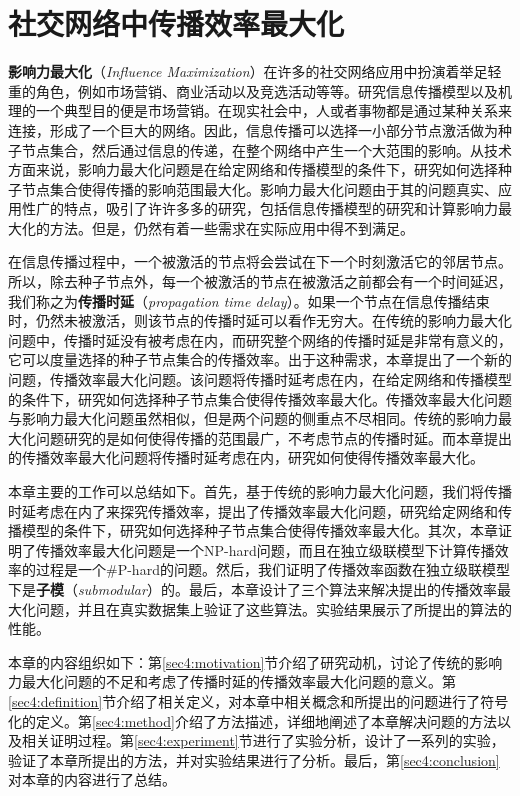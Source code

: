 \chapter{社交网络中传播效率最大化}
\label{chap4:main}
\textbf{影响力最大化}（\textit{Influence Maximization}）在许多的社交网络应用中扮演着举足轻重的角色，例如市场营销、商业活动以及竞选活动等等。研究信息传播模型以及机理的一个典型目的便是市场营销。在现实社会中，人或者事物都是通过某种关系来连接，形成了一个巨大的网络。因此，信息传播可以选择一小部分节点激活做为种子节点集合，然后通过信息的传递，在整个网络中产生一个大范围的影响。从技术方面来说，影响力最大化问题是在给定网络和传播模型的条件下，研究如何选择种子节点集合使得传播的影响范围最大化。影响力最大化问题由于其的问题真实、应用性广的特点，吸引了许许多多的研究，包括信息传播模型的研究和计算影响力最大化的方法。但是，仍然有着一些需求在实际应用中得不到满足。

在信息传播过程中，一个被激活的节点将会尝试在下一个时刻激活它的邻居节点。所以，除去种子节点外，每一个被激活的节点在被激活之前都会有一个时间延迟，我们称之为\textbf{传播时延}（\textit{propagation time delay}）。如果一个节点在信息传播结束时，仍然未被激活，则该节点的传播时延可以看作无穷大。在传统的影响力最大化问题中，传播时延没有被考虑在内，而研究整个网络的传播时延是非常有意义的，它可以度量选择的种子节点集合的传播效率。出于这种需求，本章提出了一个新的问题，传播效率最大化问题。该问题将传播时延考虑在内，在给定网络和传播模型的条件下，研究如何选择种子节点集合使得传播效率最大化。传播效率最大化问题与影响力最大化问题虽然相似，但是两个问题的侧重点不尽相同。传统的影响力最大化问题研究的是如何使得传播的范围最广，不考虑节点的传播时延。而本章提出的传播效率最大化问题将传播时延考虑在内，研究如何使得传播效率最大化。

本章主要的工作可以总结如下。首先，基于传统的影响力最大化问题，我们将传播时延考虑在内了来探究传播效率，提出了传播效率最大化问题，研究给定网络和传播模型的条件下，研究如何选择种子节点集合使得传播效率最大化。其次，本章证明了传播效率最大化问题是一个NP-hard问题，而且在独立级联模型下计算传播效率的过程是一个\#P-hard的问题。然后，我们证明了传播效率函数在独立级联模型下是\textbf{子模}（\textit{submodular}）的。最后，本章设计了三个算法来解决提出的传播效率最大化问题，并且在真实数据集上验证了这些算法。实验结果展示了所提出的算法的性能。

本章的内容组织如下：第\ref{sec4:motivation}节介绍了研究动机，讨论了传统的影响力最大化问题的不足和考虑了传播时延的传播效率最大化问题的意义。第\ref{sec4:definition}节介绍了相关定义，对本章中相关概念和所提出的问题进行了符号化的定义。第\ref{sec4:method}介绍了方法描述，详细地阐述了本章解决问题的方法以及相关证明过程。第\ref{sec4:experiment}节进行了实验分析，设计了一系列的实验，验证了本章所提出的方法，并对实验结果进行了分析。最后，第\ref{sec4:conclusion}对本章的内容进行了总结。

